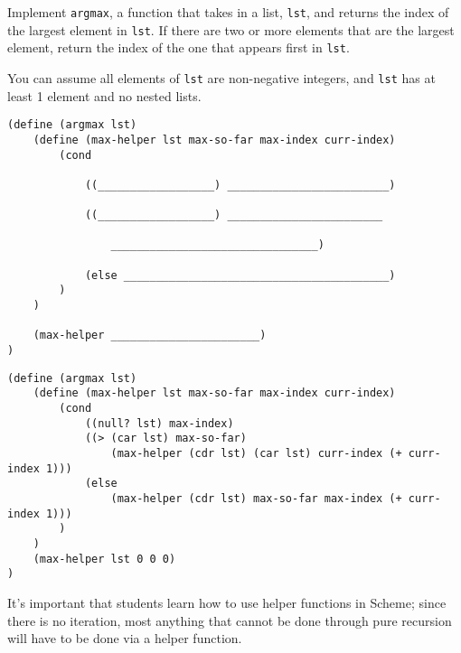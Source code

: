 \question
Implement \lstinline{argmax}, a function that takes in a list, \lstinline{lst}, and returns the index of the largest element in \lstinline{lst}. If there are two or more elements that are the largest element, return the index of the one that appears first in \lstinline{lst}.

You can assume all elements of \lstinline{lst} are non-negative integers, and \lstinline{lst} has at least 1 element and no nested lists.

\begin{lstlisting}
(define (argmax lst)
    (define (max-helper lst max-so-far max-index curr-index)
        (cond

            ((__________________) _________________________)

            ((__________________) ________________________ 

                ________________________________)

            (else _________________________________________)
        )
    )

    (max-helper _______________________)
)
\end{lstlisting}

\begin{solution}
\begin{lstlisting}
(define (argmax lst)
    (define (max-helper lst max-so-far max-index curr-index)
        (cond
            ((null? lst) max-index)
            ((> (car lst) max-so-far) 
                (max-helper (cdr lst) (car lst) curr-index (+ curr-index 1)))
            (else
                (max-helper (cdr lst) max-so-far max-index (+ curr-index 1)))
        )
    )
    (max-helper lst 0 0 0)
)
\end{lstlisting}
\end{solution}

\begin{meta}
It's important that students learn how to use helper functions in Scheme; since there is no iteration, most anything that cannot be done through pure recursion will have to be done via a helper function. 
\end{meta}
